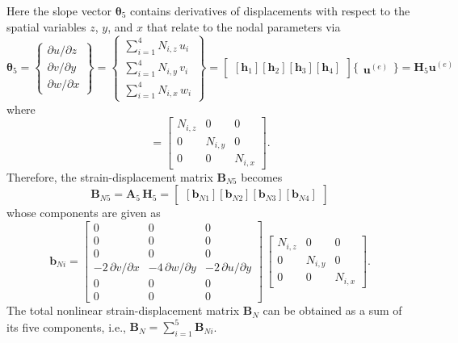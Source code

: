 Here the slope vector $\boldsymbol{\theta}_5$ contains derivatives of displacements with respect to the spatial variables $z$, $y$, and $x$ that relate to the nodal parameters via
\begin{equation}
	\boldsymbol{\theta}_5 =  \begin{Bmatrix}
		\partial u / \partial z\\
		\partial v / \partial y \\
		\partial w / \partial x
	\end{Bmatrix}
	= \begin{Bmatrix}
		\sum\nolimits_{i=1}^4 N_{i,z} \, u_i\\
		\sum\nolimits_{i=1}^4 N_{i,y} \, v_i \\
		\sum\nolimits_{i=1}^4 N_{i,x} \, w_i
	\end{Bmatrix} 
	= \begin{bmatrix}
		[\mathbf{h}_1] [\mathbf{h}_2] [\mathbf{h}_3] [\mathbf{h}_4] 
	\end{bmatrix} \bigl\{ \begin{matrix} \mathbf{u}^{(e)} \end{matrix} \bigr\}
	= \mathbf{H}_5  \mathbf{u}^{(e)}
\end{equation}
where 
\begin{equation}
	[\mathbf{h}_i] = \begin{bmatrix}
		N_{i,z} &  0 & 0  \\
		0 & N_{i,y} & 0  \\
		0 & 0 & N_{i,x} \end{bmatrix}. 
\end{equation}
Therefore, the strain-displacement matrix $\mathbf{B}_{N5}$ becomes
\begin{equation}
	\mathbf{B}_{N5} = \mathbf{A}_5 \, \mathbf{H}_5 = \begin{bmatrix}
		[\mathbf{b}_{N1}] [\mathbf{b}_{N2}] [\mathbf{b}_{N3}] [\mathbf{b}_{N4}]
	\end{bmatrix} 
\end{equation}
whose components are given as
\begin{equation}
	\mathbf{b}_{Ni} = \begin{bmatrix}
		0 & 0 &  0   \\
		0 &  0 & 0  \\
		0 &  0 & 0 \\
		- 2 \, \partial v / \partial x & - 4 \, \partial w / \partial y & - 2 \, \partial u / \partial y  \\
		0 &  0 & 0  \\
		0 &  0 & 0  \end{bmatrix} \, \begin{bmatrix}
		N_{i,z} &  0 & 0  \\
		0 & N_{i,y} & 0  \\
		0 & 0 & N_{i,x}  \end{bmatrix}.
\end{equation}
The total nonlinear strain-displacement matrix $\mathbf{B}_N$ can be obtained as a sum of its five components, i.e., $\mathbf{B}_N = \sum_{i=1}^5 \mathbf{B}_{Ni}$.

